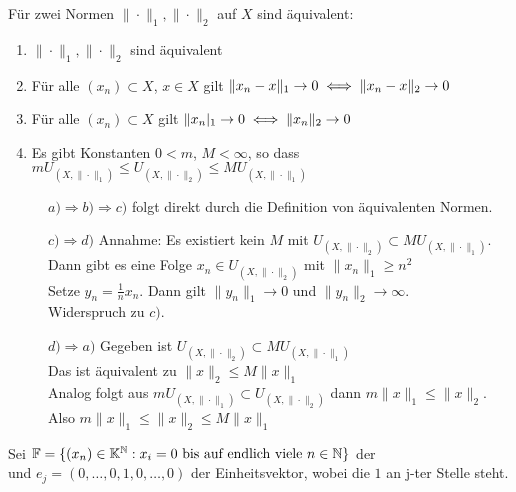 \begin{prop}
	Für zwei Normen $\| \cdot \|_{1}, \| \cdot \|_{2}$ auf $X$ sind äquivalent:
	\begin{enumerate}[label=\alph*\upshape)]
		\item $\| \cdot \|_{1}, \| \cdot \|_{2}$ sind äquivalent
		\item Für alle $(x_{n}) \subset X$, $x \in X$ gilt $\| x_{n} - x \|_{1} \rightarrow 0 \iff \| x_{n} - x \|_{2} \rightarrow 0 $
		\item Für alle $(x_{n}) \subset X$ gilt $\| x_{n} |_{1} \rightarrow 0 \iff \| x_{n} \|_{2} \rightarrow 0 $
		\item Es gibt Konstanten $0 < m$, $M < \infty$, so dass $m U_{(X, \| \cdot \|_{1})} \leq U_{(X, \| \cdot \|_{2})} \leq M U_{(X, \| \cdot \|_{1})}$
	\end{enumerate}
	\begin{beweis}
		\begin{description}
			\item[] $a) \Rightarrow b) \Rightarrow c)$ folgt direkt durch die Definition von äquivalenten Normen. 
  			\item[] $c) \Rightarrow d)$ Annahme: Es existiert kein $M$ mit $U_{(X, \| \cdot \|_{2})} \subset M U_{(X, \| \cdot \|_{1})}$. \\
  				Dann gibt es eine Folge $x_{n} \in U_{(X, \| \cdot \|_{2})}$ mit $\| x_{n} \|_{1} \geq n^{2}$ \\
  				Setze $y_{n} =  \frac{1}{n} x_{n}$. Dann gilt $\| y_{n} \|_{1} \rightarrow 0$ und $\| y_{n} \|_{2} \rightarrow \infty$. \\
  				Widerspruch zu $c)$.
  			 \item[] $d) \Rightarrow a)$ Gegeben ist $U_{(X, \| \cdot \|_{2})} \subset M U_{(X, \| \cdot \|_{1})}$ \\
  			 Das ist äquivalent zu $\| x \|_{2} \leq M \| x \|_{1}$ \\
  			 Analog folgt aus $m U_{(X, \| \cdot \|_{1})} \subset U_{(X, \| \cdot \|_{2})}$ dann $m \| x \|_{1} \leq \| x \|_{2}$. \\
  			 Also $m \| x \|_{1} \leq \| x \|_{2} \leq M \| x \|_{1}$ 
		\end{description}
	\end{beweis}
\end{prop}


\begin{vereinbarung}
Sei $\mathbb{F} = \{ (x_{n}) \in \mathbb{K}^{\mathbb{N}}: x_{i} = 0 \text{ bis auf endlich viele } n \in \mathbb{N} \} $ der  \\
und $e_{j} = (0, \dotsc, 0, 1, 0, \dotsc, 0) $ der Einheitsvektor, wobei die $1$ an j-ter Stelle steht.
\end{vereinbarung}

